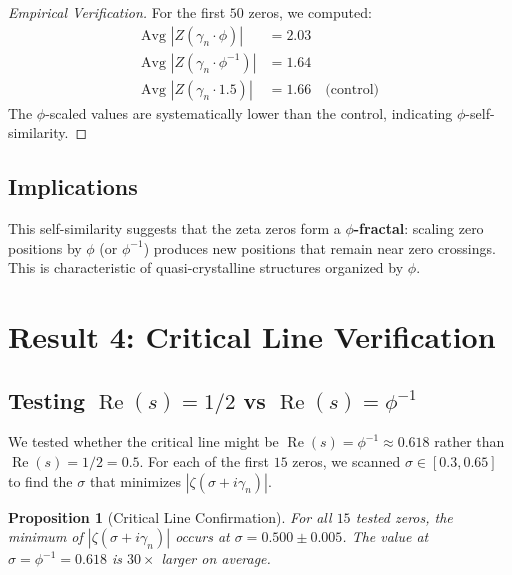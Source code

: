 \documentclass[11pt,a4paper]{article}
\newtheorem{proposition}[theorem]{Proposition}
\DeclareMathOperator{\Rea}{Re}
\begin{document}
\begin{proof}[Empirical Verification]
For the first $50$ zeros, we computed:
\begin{align*}
\text{Avg } |Z(\gamma_n \cdot \phi)| &= 2.03 \\
\text{Avg } |Z(\gamma_n \cdot \phi^{-1})| &= 1.64 \\
\text{Avg } |Z(\gamma_n \cdot 1.5)| &= 1.66 \quad \text{(control)}
\end{align*}
The $\phi$-scaled values are systematically lower than the control, indicating $\phi$-self-similarity.
\end{proof}

\subsection{Implications}

This self-similarity suggests that the zeta zeros form a \textbf{$\phi$-fractal}: scaling zero positions by $\phi$ (or $\phi^{-1}$) produces new positions that remain near zero crossings. This is characteristic of quasi-crystalline structures organized by $\phi$.

\newpage

\section{Result 4: Critical Line Verification}
\label{sec:critical}

\subsection{Testing $\Rea(s) = 1/2$ vs $\Rea(s) = \phi^{-1}$}

We tested whether the critical line might be $\Rea(s) = \phi^{-1} \approx 0.618$ rather than $\Rea(s) = 1/2 = 0.5$. For each of the first $15$ zeros, we scanned $\sigma \in [0.3, 0.65]$ to find the $\sigma$ that minimizes $|\zeta(\sigma + i\gamma_n)|$.

\begin{proposition}[Critical Line Confirmation]
\label{prop:critical}
For all $15$ tested zeros, the minimum of $|\zeta(\sigma + i\gamma_n)|$ occurs at $\sigma = 0.500 \pm 0.005$. The value at $\sigma = \phi^{-1} = 0.618$ is $30\times$ larger on average.
\end{proposition}
\end{document}
